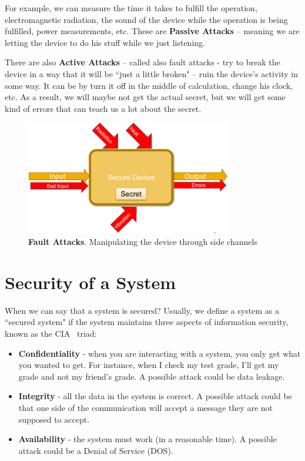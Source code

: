For example, we can measure the time it takes to fulfill the operation,
electromagnetic radiation, the sound of the device while the operation is being
fulfilled, power measurements, etc. These are \textbf{Passive Attacks} – meaning
we are letting the device to do his stuff while we just listening.

There are also \textbf{Active Attacks} – called also fault attacks -  try to
break the device in a way that it will be ``just a little broken" – ruin the
device's activity in some way. It can be by turn it off in the middle of
calculation, change his clock, etc. As a result, we will maybe not get the
actual secret, but we will get some kind of errors that can teach us a lot about
the secret. 

\begin{figure}[!ht]
    \centering
    \includegraphics[width=0.8\textwidth]{images/ch1_Intro/Secure_device3.png}
    \caption{\textbf{Fault Attacks}. Manipulating the device through side channels}
    \label{fig:SecDev3}
\end{figure}

\section{Security of a System} \label{sec:SystemSecurity}

When we can say that a system is secured? Usually, we define a system as a
``secured system" if the system maintains three aspects of information security,
known as the CIA~\cite{cia} triad:

\begin{itemize}
    \item \textbf{Confidentiality} - when you are interacting with a system, you
    only get what you wanted to get. For instance, when I check my test grade,
    I'll get my grade and not my friend's grade. A possible attack could be data
    leakage.
    \item \textbf{Integrity} - all the data in the system is correct. A possible
    attack could be that one side of the communication will accept a message
    they are not supposed to accept.
    \item \textbf{Availability} - the system must work (in a reasonable time). A
    possible attack could be a Denial of Service (DOS).
\end{itemize}

